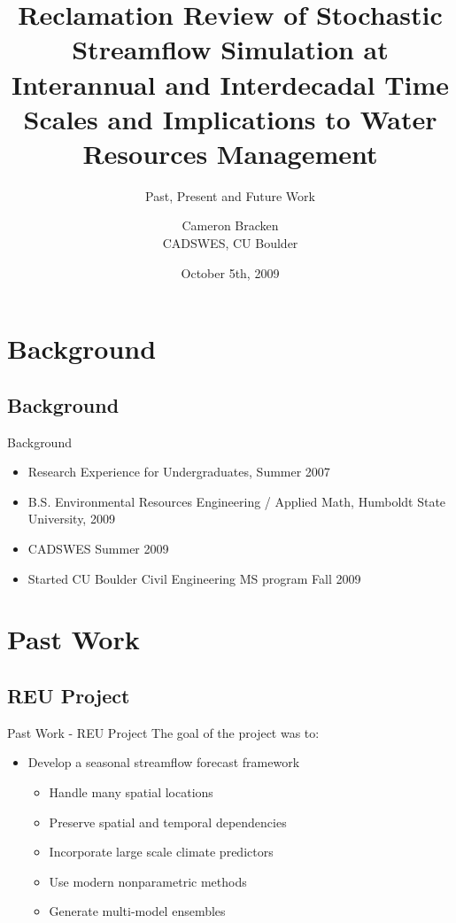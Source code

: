 \documentclass[compress]{beamer}
\title[Interannual Scale]{Reclamation Review of Stochastic Streamflow Simulation at Interannual and Interdecadal Time Scales and Implications to Water Resources Management}
\subtitle{Past, Present and Future Work}
\author[Cameron Bracken]{Cameron Bracken\\CADSWES, CU Boulder}
\date{October 5th, 2009}
\begin{document}
\begin{frame}
\titlepage
\end{frame}


\section{Background}
\subsection{Background}
\begin{frame}{Background}
\begin{itemize}
\item Research Experience for Undergraduates, Summer 2007
\item B.S. Environmental Resources Engineering / Applied Math, Humboldt State University, 2009
\item CADSWES Summer 2009
\item Started CU Boulder Civil Engineering MS program Fall 2009
\end{itemize}
\end{frame}


\section{Past Work}
\subsection{REU Project}
\begin{frame}{Past Work - REU Project}
\pause
The goal of the project was to: 
\begin{itemize}
  \item Develop a \alert{seasonal streamflow forecast framework}
\begin{itemize}

\item Handle many spatial locations 
\item Preserve spatial and temporal dependencies
\item Incorporate large scale climate predictors
\item Use modern nonparametric methods
\item Generate multi-model ensembles
\end{itemize}
\end{itemize}


\end{frame}
\end{document}
